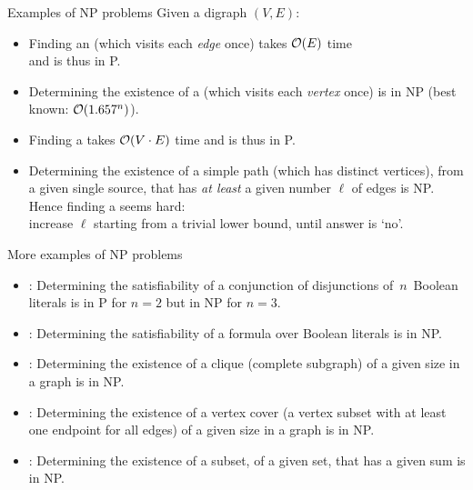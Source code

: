 \documentclass{cons-beamer}
\begin{document}
\begin{frame}{Examples of NP problems}
  Given a digraph $(V,E)$:
  \begin{examples}
  	\begin{itemize}
  		\item Finding an  (which visits each
  		\emph{edge} once) takes  $\mathcal{O}(E)$ time \\ and is thus in P. 
  		\item Determining the existence of a 
  		(which visits each \emph{vertex} once) is in NP (best known: $\mathcal{O}(1.657^n)$).
  	\end{itemize}
  \end{examples}
  \begin{examples}
    \begin{itemize}
    \item Finding a  takes 
      $\mathcal{O}(V \cdot E)$ time and is thus in P. 
    \item Determining the existence of a simple path (which has
      distinct vertices), from a given single source, that has
      \emph{at least} a given number $\ell$ of edges is NP.  
      Hence finding a 
      seems hard: \\ increase $\ell$ starting from a trivial lower
      bound, until answer is `no'.
    \end{itemize}
  \end{examples} 
\end{frame}

\begin{frame}{More examples of NP problems}
  \begin{examples}
    \begin{itemize}
      \item {}: Determining the satisfiability of a
        conjunction of disjunctions of~$n$~Boolean literals is in P for
        $n=2$ but in NP for $n=3$. 
      \item {}: Determining the satisfiability of a formula
        over Boolean literals is in NP. 
      \item {}: Determining the existence of a clique
        (complete subgraph) of a given size in a graph is in NP.
        
      \item {}: Determining the existence of a
        vertex cover (a vertex subset with at least one endpoint for all
        edges) of a given size in a graph is in NP. 
      \item {}: Determining the existence of a subset,
        of a given set, that has a given sum is in NP.
    \end{itemize}
  \end{examples}
\end{frame}
\end{document}
